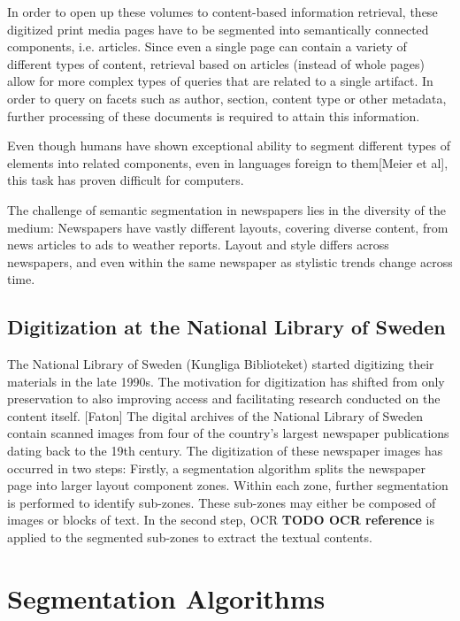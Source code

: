 \documentclass[english, bibtex]{kththesis}
\begin{document}
In order to open up these volumes to content-based information retrieval, these digitized print media pages have to be segmented into semantically connected components, i.e. articles. Since even a single page can contain a variety of different types of content, retrieval based on articles (instead of whole pages) allow for more complex types of queries that are related to a single artifact. In order to query on facets such as author, section, content type or other metadata, further processing of these documents is required to attain this information.  

Even though humans have shown exceptional ability to segment different types of elements into related components, even in languages foreign to them[Meier et al], this task has proven difficult for computers. 

The challenge of semantic segmentation in newspapers lies in the diversity of the medium: Newspapers have vastly different layouts, covering diverse content, from news articles to ads to weather reports. Layout and style differs across newspapers, and even within the same newspaper as stylistic trends change across time. 


\subsection{Digitization at the National Library of Sweden}

The National Library of Sweden (Kungliga Biblioteket) started digitizing their materials in the late 1990s. The motivation for digitization has shifted from only preservation to also improving access and facilitating research conducted on the content itself. [Faton] The digital archives of the National Library of Sweden contain scanned images from four of the country’s largest newspaper publications dating back to the 19th century. The digitization of these newspaper images has occurred in two steps: Firstly, a segmentation algorithm splits the newspaper page into larger layout component zones. Within each zone, further segmentation is performed to identify sub-zones. These sub-zones may either be composed of images or blocks of text. In the second step, OCR \textbf{TODO OCR reference} is applied to the segmented sub-zones to extract the textual contents. 

\section{Segmentation Algorithms}
\end{document}
